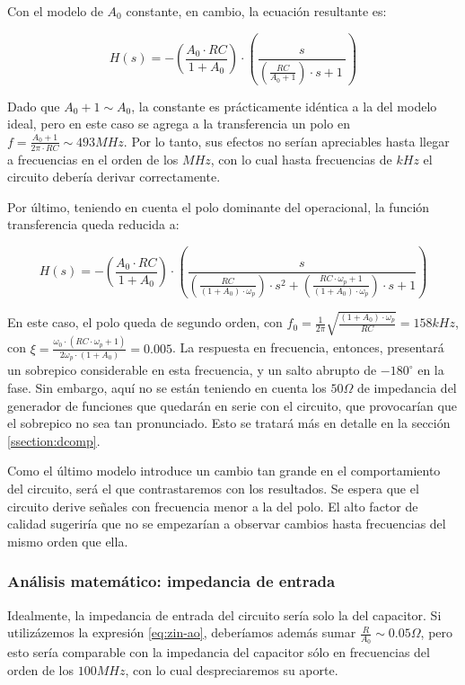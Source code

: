 \documentclass[../../main.tex]{subfiles}
\begin{document}
Con el modelo de $A_0$ constante, en cambio, la ecuaci\'on resultante es:

\[ H(s) = -\left(\frac{A_0 \cdot RC}{1+A_0}\right) \cdot \left(\frac{s}{ \left(\frac{RC}{A_0+1}\right) \cdot s + 1\ }\right)\]

Dado que $A_0+1\sim A_0$, la constante es pr\'acticamente id\'entica a la del modelo ideal, pero en este caso se agrega a la transferencia un polo en $f= \frac{A_0+1}{2\pi \cdot RC} \sim 493MHz$. Por lo tanto, sus efectos no ser\'ian apreciables hasta llegar a frecuencias en el orden de los $MHz$, con lo cual hasta frecuencias de $kHz$ el circuito deber\'ia derivar correctamente.

Por \'ultimo, teniendo en cuenta el polo dominante del operacional, la funci\'on transferencia queda reducida a:

\[ H(s) = -\left(\frac{A_0 \cdot RC}{1+A_0}\right) \cdot 
	\left( \frac{s} { \left( \frac{RC}{(1+A_0)\cdot \omega_p} \right)\cdot s^2 + \left( \frac{RC\cdot \omega_p +1}{(1+A_0)\cdot\omega_p} \right)\cdot s + 1  } \right) \]
	
En este caso, el polo queda de segundo orden, con $f_0 = \frac{1}{2\pi} \sqrt{\frac{(1+A_0)\cdot \omega_p}{RC}} = 158kHz$, con $\xi = \frac{\omega_0 \cdot (RC\cdot\omega_p+1)} {2\omega_p\cdot(1+A_0)} = 0.005$. La respuesta en frecuencia, entonces, presentar\'a un sobrepico considerable en esta frecuencia, y un salto abrupto de $-180^\circ$ en la fase. Sin embargo, aqu\'i no se est\'an teniendo en cuenta los $50\Omega$ de impedancia del generador de funciones que quedar\'an en serie con el circuito, que provocar\'ian que el sobrepico no sea tan pronunciado. Esto se tratar\'a m\'as en detalle en la secci\'on \ref{ssection:dcomp}. \par

Como el \'ultimo modelo introduce un cambio tan grande en el comportamiento del circuito, ser\'a el que contrastaremos con los resultados. Se espera que el circuito derive se\~nales con frecuencia menor a la del polo. El alto factor de calidad sugerir\'ia que no se empezar\'ian a observar cambios hasta frecuencias del mismo orden que ella.



\subsubsection{An\'alisis matem\'atico: impedancia de entrada}

Idealmente, la impedancia de entrada del circuito ser\'ia solo la del capacitor. Si utiliz\'azemos la expresi\'on \ref{eq:zin-ao}, deber\'iamos adem\'as sumar $\frac{R}{A_0}\sim 0.05\Omega$, pero esto ser\'ia comparable con la impedancia del capacitor s\'olo en frecuencias del orden de los $100MHz$, con lo cual despreciaremos su aporte.\par
	
\end{document}
